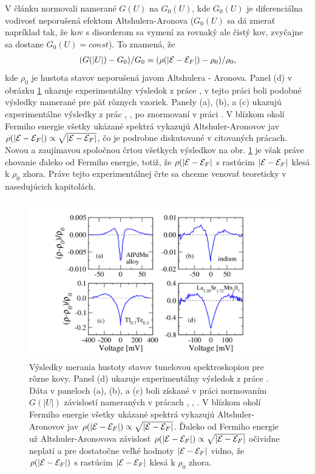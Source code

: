 V článku  \cite{Mazur} normovali namerané $G(U)$ na $G_0(U)$, kde $G_0(U)$ je diferenciálna vodivosť neporušená efektom
Altshulera-Aronova ($G_0(U)$ sa dá zmerať napríklad tak, že kov s disorderom sa vymení za rovnaký ale čistý kov, zvyčajne sa dostane $G_0(U)=const$).
To znamená, že
\begin{align}
\label{eq:02diff_2 norm}
(G(|U|) - G_0)/G_0 = (\rho(|\mathcal{E}- \mathcal{E}_F|) - \rho_0)/\rho_0 \text{,}
\end{align}
kde $\rho_0$ je hustota stavov neporušená javom Altshulera - Aronova. Panel (d) v obrázku \ref{fig:B2} ukazuje experimentálny výsledok z práce \cite{Mazur}, v tejto práci
boli podobné výsledky namerané pre päť rôznych vzoriek. Panely (a), (b), a (c)  ukazujú experimentálne výsledky z prác  \cite{Schmitz1}, \cite{Schmitz2}, \cite{Escudero}
po znormovaní v práci \cite{Moskova}. V blízkom okolí Fermiho energie všetky ukázané spektrá vykazujú Altshuler-Aronovov jav $\rho(|\mathcal{E}- \mathcal{E}_F|) \propto \sqrt{|\mathcal{E}- \mathcal{E}_F|}$,
čo je podrobne diskutované v citovaných prácach. Novou a zaujímavou spoločnou črtou všetkych výsledkov na obr. \ref{fig:B2} je však práve chovanie ďaleko od Fermiho energie,
totiž, že $\rho(|\mathcal{E}- \mathcal{E}_F|$ s rastúcim $|\mathcal{E} - \mathcal{E}_F|$ klesá k $\rho_0$ zhora. Práve tejto experimentálnej črte sa chceme venovať teoreticky v nasedujúcich kapitolách.

\begin{figure}[H]
\centering
\includegraphics[scale=1]{grafy/B2}
\caption{Výsledky merania hustoty stavov tunelovou spektroskopiou pre rôzne kovy. Panel (d) ukazuje experimentálny výsledok z práce \cite{Mazur}. Dáta v paneloch (a), (b), a (c)
boli získané v práci \cite{Moskova} normovaním $G(|U|)$ závislostí nameraných v prácach \cite{Schmitz1}, \cite{Schmitz2}, \cite{Escudero}. V blízkom okolí Fermiho energie všetky ukázané spektrá vykazujú Altshuler-Aronovov jav $\rho(|\mathcal{E}- \mathcal{E}_F|) \propto \sqrt{|\mathcal{E}- \mathcal{E}_F|}$. Ďaleko od Fermiho energie už Altshuler-Aronovova závislosť
$\rho(|\mathcal{E}- \mathcal{E}_F|) \propto \sqrt{|\mathcal{E}- \mathcal{E}_F|}$ očividne neplatí a pre dostatočne veľké hodnoty $|\mathcal{E} - \mathcal{E}_F|$ vidno, že $\rho(|\mathcal{E}- \mathcal{E}_F|)$ s rastúcim $|\mathcal{E} - \mathcal{E}_F|$ klesá k $\rho_0$ zhora. }
\label{fig:B2}
\end{figure}




\newpage

